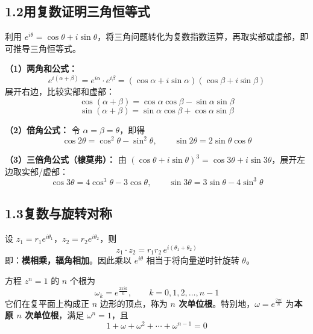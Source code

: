 \documentclass[12pt, a4paper]{ctexart}
\begin{document}
\subsection*{1.2\quad 用复数证明三角恒等式}

\begin{knowledgebox}[核心思路]
利用 $e^{i\theta}=\cos\theta+i\sin\theta$，将三角问题转化为复数指数运算，再取实部或虚部，即可推导三角恒等式。
\end{knowledgebox}

\begin{tipbox}[常用恒等式的复数推导]
\textbf{（1）两角和公式：}
\[
  e^{i(\alpha+\beta)} = e^{i\alpha}\cdot e^{i\beta}
  = (\cos\alpha+i\sin\alpha)(\cos\beta+i\sin\beta)
\]
展开右边，比较实部和虚部：
\[
  \cos(\alpha+\beta) = \cos\alpha\cos\beta - \sin\alpha\sin\beta
\]
\[
  \sin(\alpha+\beta) = \sin\alpha\cos\beta + \cos\alpha\sin\beta
\]

\textbf{（2）倍角公式：}
令 $\alpha=\beta=\theta$，即得
\[
  \cos 2\theta = \cos^2\theta - \sin^2\theta, \qquad
  \sin 2\theta = 2\sin\theta\cos\theta
\]

\textbf{（3）三倍角公式（棣莫弗）：}
由 $(\cos\theta+i\sin\theta)^3 = \cos 3\theta + i\sin 3\theta$，展开左边取实部/虚部：
\[
  \cos 3\theta = 4\cos^3\theta - 3\cos\theta, \qquad
  \sin 3\theta = 3\sin\theta - 4\sin^3\theta
\]
\end{tipbox}

\subsection*{1.3\quad 复数与旋转对称}

\begin{knowledgebox}[复数乘法的几何意义]
设 $z_1 = r_1 e^{i\theta_1}$，$z_2 = r_2 e^{i\theta_2}$，则
\[
  z_1 \cdot z_2 = r_1 r_2\, e^{i(\theta_1+\theta_2)}
\]
即：\textbf{模相乘，辐角相加}。因此乘以 $e^{i\theta}$ 相当于将向量逆时针旋转 $\theta$。
\end{knowledgebox}

\begin{knowledgebox}[单位根与正多边形]
方程 $z^n = 1$ 的 $n$ 个根为
\[
  \omega_k = e^{\frac{2\pi i k}{n}},\qquad k=0,1,2,\ldots,n-1
\]
它们在复平面上构成正 $n$ 边形的顶点，称为 \textbf{$n$ 次单位根}。特别地，$\omega = e^{\frac{2\pi i}{n}}$ 为\textbf{本原 $n$ 次单位根}，满足 $\omega^n=1$，且
\[
  1+\omega+\omega^2+\cdots+\omega^{n-1}=0
\]
\end{knowledgebox}
\end{document}
